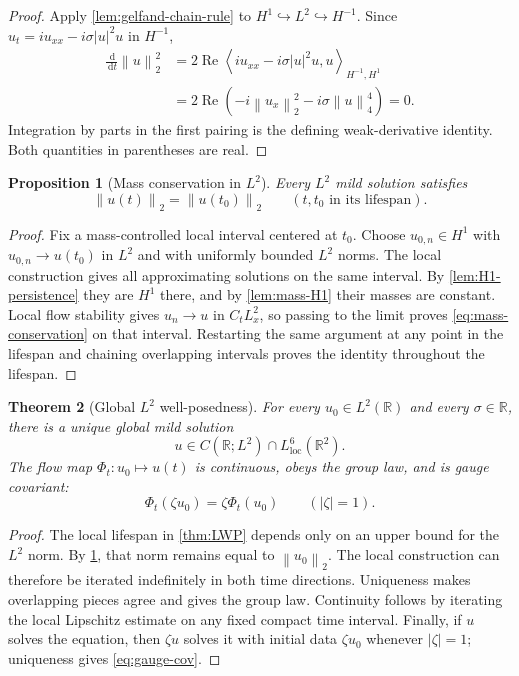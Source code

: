 \documentclass[11pt,oneside]{book}
\newtheorem{theorem}{Theorem}[chapter]
\newtheorem{proposition}[theorem]{Proposition}
\theoremstyle{definition}
\theoremstyle{remark}
\newcommand{\R}{\mathbb R}
\newcommand{\1}{\mathbf 1}
\newcommand{\loc}{\mathrm{loc}}
\newcommand{\Rea}{\operatorname{Re}}
\newcommand{\dd}{\,\mathrm d}
\newcommand{\norm}[1]{\left\lVert #1\right\rVert}
\newcommand{\pair}[2]{\left\langle #1,#2\right\rangle}
\begin{document}
\begin{proof}
Apply \cref{lem:gelfand-chain-rule} to
$H^1\hookrightarrow L^2\hookrightarrow H^{-1}$.  Since
$u_t=i u_{xx}-i\sigma|u|^2u$ in $H^{-1}$,
\begin{align*}
 \frac{\dd}{\dd t}\norm u_2^2
 &=2\Rea\pair{i u_{xx}-i\sigma|u|^2u}{u}_{H^{-1},H^1}\\
 &=2\Rea\left(-i\norm{u_x}_2^2-i\sigma\norm u_4^4\right)=0.
\end{align*}
Integration by parts in the first pairing is the defining weak-derivative
identity.  Both quantities in parentheses are real.
\end{proof}

\begin{proposition}[Mass conservation in $L^2$]\label{prop:mass-L2}
Every $L^2$ mild solution satisfies
\begin{equation}
  \norm{u(t)}_2=\norm{u(t_0)}_2\qquad(t,t_0\text{ in its lifespan}).
  \label{eq:mass-conservation}
\end{equation}
\end{proposition}

\begin{proof}
Fix a mass-controlled local interval centered at $t_0$.  Choose
$u_{0,n}\in H^1$ with $u_{0,n}\to u(t_0)$ in $L^2$ and with uniformly
bounded $L^2$ norms.  The local construction gives all approximating
solutions on the same interval.  By \cref{lem:H1-persistence} they are
$H^1$ there, and by \cref{lem:mass-H1} their masses are constant.  Local
flow stability gives $u_n\to u$ in $C_tL^2_x$, so passing to the limit proves
\eqref{eq:mass-conservation} on that interval.  Restarting the same argument
at any point in the lifespan and chaining overlapping intervals proves the
identity throughout the lifespan.
\end{proof}

\begin{theorem}[Global $L^2$ well-posedness]\label{thm:GWP}
For every $u_0\in L^2(\R)$ and every $\sigma\in\R$, there is a unique global
mild solution
\[
 u\in C(\R;L^2)\cap L^6_{\loc}(\R^2).
\]
The flow map $\Phi_t:u_0\mapsto u(t)$ is continuous, obeys the group law, and
is gauge covariant:
\begin{equation}
  \Phi_t(\zeta u_0)=\zeta\Phi_t(u_0)
  \qquad(|\zeta|=1).                               \label{eq:gauge-cov}
\end{equation}
\end{theorem}

\begin{proof}
The local lifespan in \cref{thm:LWP} depends only on an upper bound for the
$L^2$ norm.  By \cref{prop:mass-L2}, that norm remains equal to
$\norm{u_0}_2$.  The local construction can therefore be iterated indefinitely
in both time directions.  Uniqueness makes overlapping pieces agree and gives
the group law.  Continuity follows by iterating the local Lipschitz estimate
on any fixed compact time interval.  Finally, if $u$ solves the equation, then
$\zeta u$ solves it with initial data $\zeta u_0$ whenever $|\zeta|=1$;
uniqueness gives \eqref{eq:gauge-cov}.
\end{proof}
\end{document}
